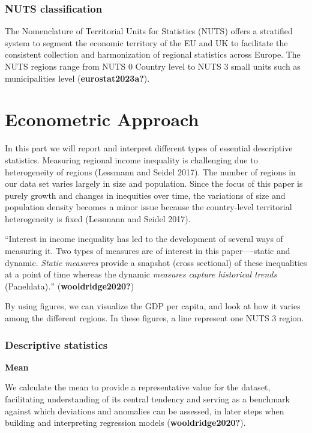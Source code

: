 \documentclass[
  a4paper,
  DIV=11,
  numbers=noendperiod]{scrartcl}
\begin{document}
\hypertarget{nuts-classification}{%
\subsubsection{NUTS classification}\label{nuts-classification}}

The Nomenclature of Territorial Units for Statistics (NUTS) offers a
stratified system to segment the economic territory of the EU and UK to
facilitate the consistent collection and harmonization of regional
statistics across Europe. The NUTS regions range from NUTS 0 Country
level to NUTS 3 small units such as municipalities level
(\textbf{eurostat2023a?}). ~

\hypertarget{econometric-approach}{%
\section{Econometric Approach}\label{econometric-approach}}

In this part we will report and interpret different types of essential
descriptive statistics. Measuring regional income inequality is
challenging due to heterogeneity of regions (Lessmann and Seidel 2017).
The number of regions in our data set varies largely in size and
population. Since the focus of this paper is purely growth and changes
in inequities over time, the variations of size and population density
becomes a minor issue because the country-level territorial
heterogeneity is fixed (Lessmann and Seidel 2017).

``Interest in income inequality has led to the development of several
ways of measuring it. Two types of measures are of interest in this
paper----static and dynamic. \emph{Static measures} provide a snapshot
(cross sectional) of these inequalities at a point of time whereas the
dynamic \emph{measures capture historical trends} (Paneldata)\emph{.}''
(\textbf{wooldridge2020?})

By using figures, we can visualize the GDP per capita, and look at how
it varies among the different regions. In these figures, a line
represent one NUTS 3 region.

\hypertarget{descriptive-statistics}{%
\subsubsection{Descriptive statistics}\label{descriptive-statistics}}

\textbf{Mean}

We calculate the mean to provide a representative value for the dataset,
facilitating understanding of its central tendency and serving as a
benchmark against which deviations and anomalies can be assessed, in
later steps when building and interpreting regression models
(\textbf{wooldridge2020?}).
\end{document}
